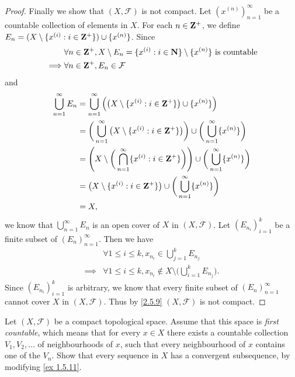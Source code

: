 \begin{proof}
  Finally we show that \((X, \mathcal{F})\) is not compact.
  Let \((x^{(n)})_{n = 1}^\infty\) be a countable collection of elements in \(X\).
  For each \(n \in \mathbf{Z}^+\), we define \(E_n = (X \setminus \{x^{(i)} : i \in \mathbf{Z}^+\}) \cup \{x^{(n)}\}\).
  Since
  \begin{align*}
             & \forall n \in \mathbf{Z}^+, X \setminus E_n = \{x^{(i)} : i \in \mathbf{N}\} \setminus \{x^{(n)}\} \text{ is countable} \\
    \implies & \forall n \in \mathbf{Z}^+, E_n \in \mathcal{F}
  \end{align*}
  and
  \begin{align*}
    \bigcup_{n = 1}^\infty E_n & = \bigcup_{n = 1}^\infty \Big(\big(X \setminus \{x^{(i)} : i \in \mathbf{Z}^+\}\big) \cup \{x^{(n)}\}\Big)                                        \\
                               & = \bigg(\bigcup_{n = 1}^\infty \big(X \setminus \{x^{(i)} : i \in \mathbf{Z}^+\}\big)\bigg) \cup \bigg(\bigcup_{n = 1}^\infty \{x^{(n)}\}\bigg)   \\
                               & = \Bigg(X \setminus \bigg(\bigcap_{n = 1}^\infty \{x^{(i)} : i \in \mathbf{Z}^+\}\bigg)\Bigg) \cup \bigg(\bigcup_{n = 1}^\infty \{x^{(n)}\}\bigg) \\
                               & = \big(X \setminus \{x^{(i)} : i \in \mathbf{Z}^+\}\big) \cup \bigg(\bigcup_{n = 1}^\infty \{x^{(n)}\}\bigg)                                      \\
                               & = X,
  \end{align*}
  we know that \(\bigcup_{n = 1}^\infty E_n\) is an open cover of \(X\) in \((X, \mathcal{F})\).
  Let \((E_{n_i})_{i = 1}^k\) be a finite subset of \((E_n)_{n = 1}^\infty\).
  Then we have
  \begin{align*}
             & \forall 1 \leq i \leq k, x_{n_i} \in \bigcup_{j = 1}^k E_{n_j}                             \\
    \implies & \forall 1 \leq i \leq k, x_{n_i} \notin X \setminus \bigg(\bigcup_{i = 1}^k E_{n_j}\bigg).
  \end{align*}
  Since \((E_{n_i})_{i = 1}^k\) is arbitrary, we know that every finite subset of \((E_n)_{n = 1}^\infty\) cannot cover \(X\) in \((X, \mathcal{F})\).
  Thus by \cref{2.5.9} \((X, \mathcal{F})\) is not compact.
\end{proof}

\setcounter{exercise}{8}
\begin{exercise}\label{ex 2.5.9}
  Let \((X, \mathcal{F})\) be a compact topological space.
  Assume that this space is \emph{first countable}, which means that for every \(x \in X\) there exists a countable collection \(V_1 , V_2 , \dots\) of neighbourhoods of \(x\), such that every neighbourhood of \(x\) contains one of the \(V_n\).
  Show that every sequence in \(X\) has a convergent subsequence, by modifying \cref{ex 1.5.11}.
\end{exercise}

